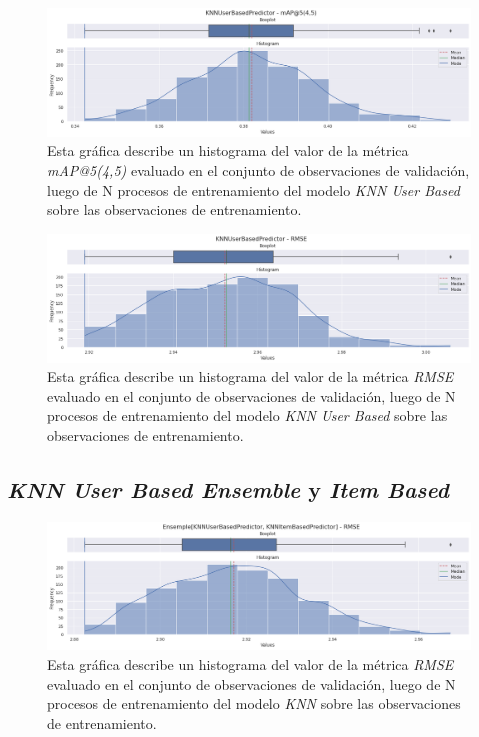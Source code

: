 \documentclass[11pt,a4paper,twoside]{thesis}
\begin{document}
{\begin{figure}[!htb]
	\centering
	\includegraphics[width=15cm]{./images/metrics-knn-user-based-mapk.png}
	\caption{Esta gráfica describe un histograma del valor de la métrica \textit{mAP@5(4,5)} evaluado en el conjunto de observaciones de validación, luego de N procesos de entrenamiento del modelo \textit{KNN User Based} sobre las observaciones de entrenamiento.}
\end{figure}

\begin{figure}[!htb]
	\centering
	\includegraphics[width=15cm]{./images/metrics-knn-user-based-RMSE.png}
	\caption{Esta gráfica describe un histograma del valor de la métrica \textit{RMSE} evaluado en el conjunto de observaciones de validación, luego de N procesos de entrenamiento del modelo \textit{KNN User Based} sobre las observaciones de entrenamiento.}
\end{figure}

\clearpage

\subsection{\textit{KNN User Based Ensemble} y \textit{Item Based}}

\begin{figure}[!htb]
	\centering
	\includegraphics[width=15cm]{./images/metrics-knn-ensemple-RMSE.png}
	\caption{Esta gráfica describe un histograma del valor de la métrica \textit{RMSE} evaluado en el conjunto de observaciones de validación, luego de N procesos de entrenamiento del modelo \textit{KNN} sobre las observaciones de entrenamiento.}
\end{figure}

}
\end{document}

